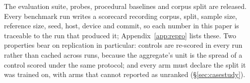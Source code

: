 The evaluation suite, probes, procedural baselines and corpus split are
released. Every benchmark run writes a scorecard
recording corpus, split, sample size, reference size, seed, host, device and
commit, so each number in this paper is traceable to the run that produced it;
Appendix~\ref{app:repro} lists these. Two properties bear on replication in
particular: controls are re-scored in every run rather than cached across runs,
because the aggregate's unit is the spread of a control scored under the same
protocol; and every arm must declare the split it was trained on, with arms that
cannot reported as unranked (\S\ref{sec:casestudy}).
